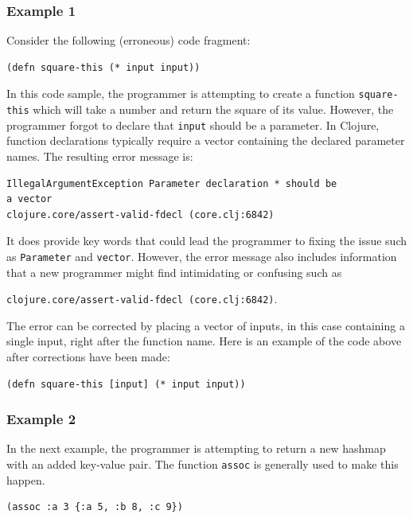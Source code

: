 \documentclass[12pt]{article}
\newcommand{\comment}[1]{{\bf \tt  {#1}}}
\newcommand{\emcomment}[1]{\textcolor{ForestGreen}{\comment{Elena: {#1}}}}
\begin{document}
\subsubsection{Example 1}\label{sec:ex1}

Consider the following (erroneous) code fragment:
\begin{verbatim}
(defn square-this (* input input))
\end{verbatim}

In this code sample, the programmer is attempting to create a function \texttt{square-this} which will take a number and return the square of its value.
However, the programmer forgot to declare that \texttt{input} should be a parameter.
In Clojure, function declarations typically require a vector containing the declared parameter names.
The resulting error message is: 
\begin{verbatim}
IllegalArgumentException Parameter declaration * should be 
a vector 
clojure.core/assert-valid-fdecl (core.clj:6842)
\end{verbatim}
It does provide key words that could lead the programmer to fixing the issue such as \texttt{Parameter} and \texttt{vector}.
However, the error message also includes information that a new programmer might find intimidating or confusing such as 

\noindent
\texttt{clojure.core/assert-valid-fdecl (core.clj:6842)}.



The error can be corrected by placing a vector of inputs, in this case containing a single input, right after the function name.
Here is an example of the code above after corrections have been made:
\begin{verbatim}
(defn square-this [input] (* input input))
\end{verbatim}

\subsubsection{Example 2}\label{sec:ex2}

In the next example, the programmer is attempting to return a new hashmap with an added key-value pair.
The function \texttt{assoc} is generally used to make this happen.
\begin{verbatim}
(assoc :a 3 {:a 5, :b 8, :c 9})
\end{verbatim}
\end{document}
